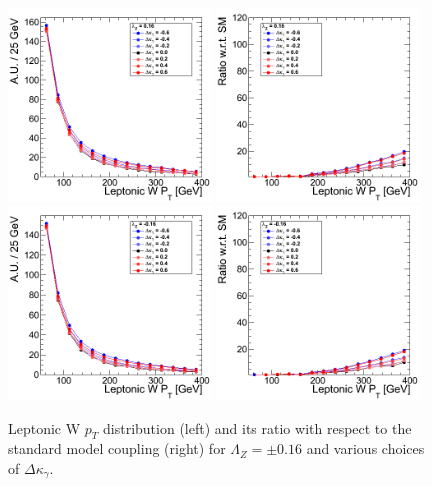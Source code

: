 \begin{figure}[h!t]
  {\centering
    \includegraphics[width=0.48\textwidth]{figs/LeptonicWpT_016.png}
    \includegraphics[width=0.48\textwidth]{figs/LeptonicWpT_016_ratio.png}
    \includegraphics[width=0.48\textwidth]{figs/LeptonicWpT_m016.png}
    \includegraphics[width=0.48\textwidth]{figs/LeptonicWpT_m016_ratio.png}
    \caption{Leptonic W $p_T$ distribution (left) and its ratio with respect to 
    the standard model coupling (right) for $\Lambda_Z = \pm 0.16$ and various choices of $\Delta{\kappa_\gamma}$.}
    \label{fig:ww_LeptonicWpT_atgcRatio016}}
\end{figure}

